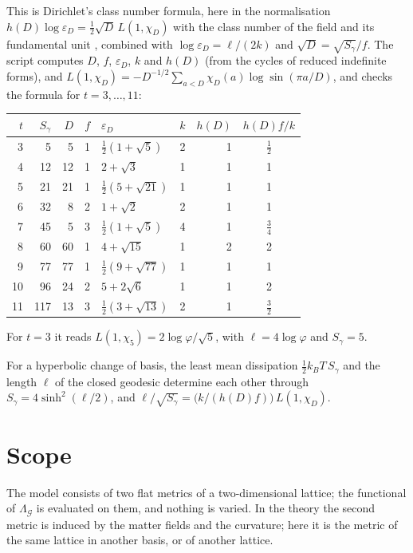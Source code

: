 \documentclass[11pt]{article}
\begin{document}
\noindent
This is Dirichlet's class number formula, here in the normalisation $h(D)\log\varepsilon_D = \tfrac12\sqrt D\,L(1,\chi_D)$ with the class number of the field and its fundamental unit \cite{Davenport}, combined with $\log\varepsilon_D = \ell/(2k)$ and $\sqrt D = \sqrt{S_\gamma}/f$.
The script computes $D$, $f$, $\varepsilon_D$, $k$ and $h(D)$ (from the cycles of reduced indefinite forms), and $L(1,\chi_D) = -D^{-1/2}\sum_{a<D}\chi_D(a)\log\sin(\pi a/D)$, and checks the formula for $t = 3,\dots,11$:

\begin{center}
\small
\begin{tabular}{@{}rrrrlrrc@{}}
\toprule
$t$ & $S_\gamma$ & $D$ & $f$ & $\varepsilon_D$ & $k$ & $h(D)$ & $h(D)f/k$\\
\midrule
3 & 5 & 5 & 1 & $\tfrac12(1+\sqrt5)$ & 2 & 1 & $\tfrac12$\\
4 & 12 & 12 & 1 & $2+\sqrt3$ & 1 & 1 & 1\\
5 & 21 & 21 & 1 & $\tfrac12(5+\sqrt{21})$ & 1 & 1 & 1\\
6 & 32 & 8 & 2 & $1+\sqrt2$ & 2 & 1 & 1\\
7 & 45 & 5 & 3 & $\tfrac12(1+\sqrt5)$ & 4 & 1 & $\tfrac34$\\
8 & 60 & 60 & 1 & $4+\sqrt{15}$ & 1 & 2 & 2\\
9 & 77 & 77 & 1 & $\tfrac12(9+\sqrt{77})$ & 1 & 1 & 1\\
10 & 96 & 24 & 2 & $5+2\sqrt6$ & 1 & 1 & 2\\
11 & 117 & 13 & 3 & $\tfrac12(3+\sqrt{13})$ & 2 & 1 & $\tfrac32$\\
\bottomrule
\end{tabular}
\end{center}

\noindent
For $t=3$ it reads $L(1,\chi_5) = 2\log\varphi/\sqrt5$, with $\ell = 4\log\varphi$ and $S_\gamma = 5$.

\physical
For a hyperbolic change of basis, the least mean dissipation $\tfrac12k_BT\,S_\gamma$ and the length $\ell$ of the closed geodesic determine each other through $S_\gamma = 4\sinh^2(\ell/2)$, and $\ell/\sqrt{S_\gamma} = \bigl(k/(h(D)f)\bigr)\,L(1,\chi_D)$.

\section{Scope}

The model consists of two flat metrics of a two-dimensional lattice; the functional of $\Lambda_{\mathcal G}$ is evaluated on them, and nothing is varied.
In the theory the second metric is induced by the matter fields and the curvature; here it is the metric of the same lattice in another basis, or of another lattice.
\end{document}

